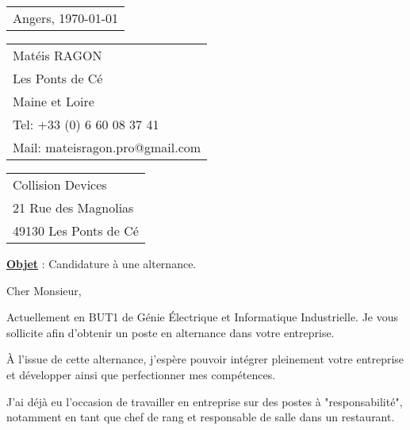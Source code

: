 \documentclass[french]{article}
\begin{document}

\hfill
\begin{tabular}{@{} l}
	\bigskip Angers, \today \\ %
\end{tabular}


\begin{tabular}{l @{}}
	Matéis RAGON \\ 
	Les Ponts de Cé \\
	Maine et Loire \\ %
	Tel: +33 (0) 6 60 08 37 41 \\
	Mail: mateisragon.pro@gmail.com
\end{tabular}

\hfill
\begin{tabular}{@{} l}
	Collision Devices \\
	21 Rue des Magnolias \\
	49130 Les Ponts de Cé
\end{tabular}

\bigskip %

\textbf{\underline{Objet}} :  Candidature à une alternance.


\bigskip %

Cher Monsieur,


Actuellement en BUT1 de Génie Électrique et Informatique Industrielle. Je vous sollicite afin d'obtenir un poste en alternance dans votre entreprise.

À l'issue de cette alternance, j'espère pouvoir intégrer pleinement votre entreprise et développer ainsi que perfectionner mes compétences.

J'ai déjà eu l'occasion de travailler en entreprise sur des postes à "responsabilité", notamment en tant que chef de rang et responsable de salle dans un restaurant.
\end{document}
